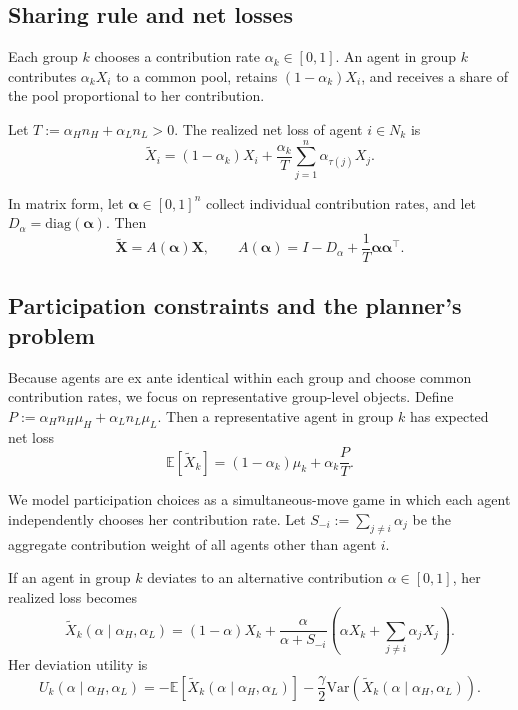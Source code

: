 \documentclass[a4paper,12pt]{article}
\theoremstyle{definition}
\theoremstyle{remark}
\newcommand{\E}{\mathbb{E}}
\newcommand{\Var}{\mathrm{Var}}
\newcommand{\1}{\mathbf{1}}
\begin{document}
\subsection{Sharing rule and net losses}

Each group \(k\) chooses a contribution rate \(\alpha_k\in[0,1]\). An agent in group \(k\) contributes \(\alpha_k X_i\) to a common pool, retains \((1-\alpha_k)X_i\), and receives a share of the pool proportional to her contribution.

Let \(T:=\alpha_H n_H+\alpha_L n_L>0\). The realized net loss of agent \(i\in N_k\) is
\begin{equation}\label{eq:netloss-general}
\tilde X_i
=
(1-\alpha_k)X_i
+
\frac{\alpha_k}{T}\sum_{j=1}^n \alpha_{\tau(j)}X_j.
\end{equation}

In matrix form, let \(\boldsymbol{\alpha}\in[0,1]^n\) collect individual contribution rates, and let \(D_\alpha=\mathrm{diag}(\boldsymbol{\alpha})\). Then
\[
\tilde{\mathbf X}
=
A(\boldsymbol{\alpha})\mathbf X,
\qquad
A(\boldsymbol{\alpha})
=
I-D_\alpha+\frac{1}{T}\boldsymbol{\alpha}\boldsymbol{\alpha}^\top.
\]

\subsection{Participation constraints and the planner's problem}

Because agents are ex ante identical within each group and choose common contribution rates, we focus on representative group-level objects. Define \(P:=\alpha_H n_H\mu_H+\alpha_L n_L\mu_L\). Then a representative agent in group \(k\) has expected net loss
\begin{equation}\label{eq:mean-type-general}
\E[\tilde X_k]
=
(1-\alpha_k)\mu_k+\alpha_k\frac{P}{T}.
\end{equation}

We model participation choices as a simultaneous-move game in which each agent independently chooses her contribution rate. Let $S_{-i}:=\sum_{j\neq i}\alpha_j$ be the aggregate contribution weight of all agents other than agent $i$.

If an agent in group \(k\) deviates to an alternative contribution \(\alpha\in[0,1]\), her realized loss becomes
\begin{equation}\label{eq:devloss-general}
\tilde X_k(\alpha\mid \alpha_H,\alpha_L)
=
(1-\alpha)X_k
+
\frac{\alpha}{\alpha+S_{-i}}
\left(
\alpha X_k+\sum_{j\neq i}\alpha_j X_j
\right).
\end{equation}
Her deviation utility is
\begin{equation}\label{eq:devutility-general}
U_k(\alpha\mid \alpha_H,\alpha_L)
=
-\E[\tilde X_k(\alpha\mid \alpha_H,\alpha_L)]
-\frac{\gamma}{2}\Var(\tilde X_k(\alpha\mid \alpha_H,\alpha_L)).
\end{equation}
\end{document}
